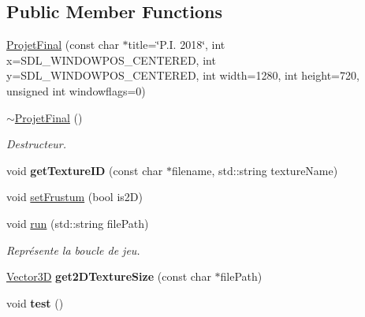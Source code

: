 \subsection*{Public Member Functions}
\begin{DoxyCompactItemize}
\item 
\hyperlink{class_projet_final_a87682faa1a37e08de15cb2dda19871ed}{Projet\+Final} (const char $\ast$title=\char`\"{}P.\+I. 2018\char`\"{}, int x=S\+D\+L\+\_\+\+W\+I\+N\+D\+O\+W\+P\+O\+S\+\_\+\+C\+E\+N\+T\+E\+R\+E\+D, int y=S\+D\+L\+\_\+\+W\+I\+N\+D\+O\+W\+P\+O\+S\+\_\+\+C\+E\+N\+T\+E\+R\+E\+D, int width=1280, int height=720, unsigned int windowflags=0)
\item 
\hypertarget{class_projet_final_a72bb803a8447c986acb05e414fbd7edd}{}\hyperlink{class_projet_final_a72bb803a8447c986acb05e414fbd7edd}{$\sim$\+Projet\+Final} ()\label{class_projet_final_a72bb803a8447c986acb05e414fbd7edd}

\begin{DoxyCompactList}\small\item\em Destructeur. \end{DoxyCompactList}\item 
\hypertarget{class_projet_final_ae5ea1c3d2e86273a7f829c10a5c5bbaf}{}void {\bfseries get\+Texture\+I\+D} (const char $\ast$filename, std\+::string texture\+Name)\label{class_projet_final_ae5ea1c3d2e86273a7f829c10a5c5bbaf}

\item 
void \hyperlink{class_projet_final_a3960167ffdcd242d8298880aa0f30187}{set\+Frustum} (bool is2\+D)
\item 
\hypertarget{class_projet_final_a12616db72c2d19bfe4eba5cc3e9d6eb9}{}void \hyperlink{class_projet_final_a12616db72c2d19bfe4eba5cc3e9d6eb9}{run} (std\+::string file\+Path)\label{class_projet_final_a12616db72c2d19bfe4eba5cc3e9d6eb9}

\begin{DoxyCompactList}\small\item\em Représente la boucle de jeu. \end{DoxyCompactList}\item 
\hypertarget{class_projet_final_a226ccc2bb95e587873a1adf2689a1192}{}\hyperlink{class_vector3_d}{Vector3\+D} {\bfseries get2\+D\+Texture\+Size} (const char $\ast$file\+Path)\label{class_projet_final_a226ccc2bb95e587873a1adf2689a1192}

\item 
\hypertarget{class_projet_final_a48593276330adfdfb87591953ccb5507}{}void {\bfseries test} ()\label{class_projet_final_a48593276330adfdfb87591953ccb5507}

\end{DoxyCompactItemize}
